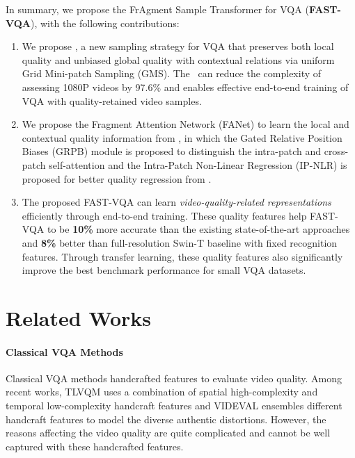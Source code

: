 \documentclass[runningheads]{llncs}
\begin{document}
In summary, we propose the FrAgment Sample Transformer for VQA (\textbf{FAST-VQA}), with the following contributions:

\begin{enumerate}
\item We propose \frag, a new sampling strategy for VQA that preserves both local quality and unbiased global quality with contextual relations via uniform Grid Mini-patch Sampling (GMS). The \frag~can reduce the complexity of assessing 1080P videos by 97.6\% and enables effective end-to-end training of VQA with quality-retained video samples.

\item We propose the Fragment Attention Network (FANet) to learn the local and contextual quality information from \frag, in which the Gated Relative Position Biases (GRPB) module is proposed to distinguish the intra-patch and cross-patch self-attention and the Intra-Patch Non-Linear Regression (IP-NLR) is proposed for better quality regression from \frag.



\item The proposed FAST-VQA can learn \textit{video-quality-related representations} efficiently through end-to-end training. These quality features help FAST-VQA to be \textbf{10\%} more accurate than the existing state-of-the-art approaches and \textbf{8\%} better than full-resolution Swin-T baseline with fixed recognition features. Through transfer learning, these quality features also significantly improve the best benchmark performance for small VQA datasets.
\end{enumerate}


\section{Related Works}


\paragraph{{Classical VQA Methods}} Classical VQA methods \cite{vbliinds,viideo,tlvqm,videval,rapique,tpqi} handcrafted features to evaluate video quality. Among recent works, TLVQM \cite{tlvqm} uses a combination of spatial high-complexity and temporal low-complexity handcraft features and VIDEVAL \cite{videval} ensembles different handcraft features to model the diverse authentic distortions. However, the reasons affecting the video quality are quite complicated and cannot be well captured with these handcrafted features.
\end{document}
